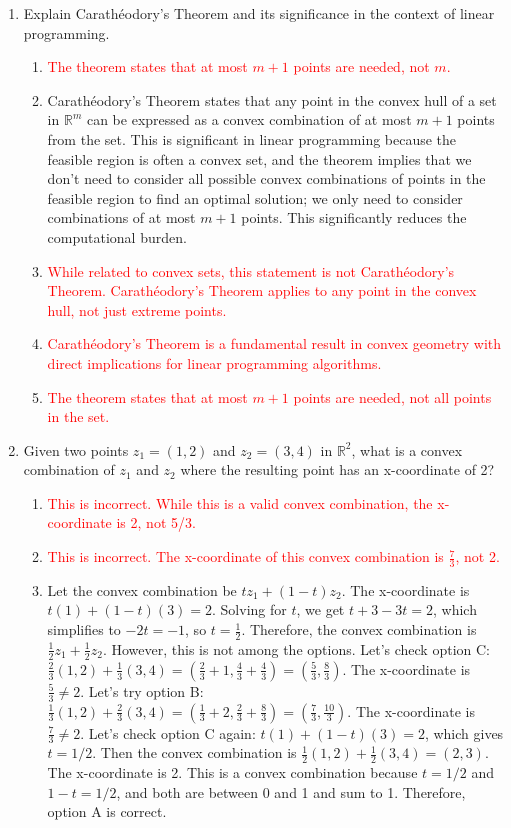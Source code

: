 \documentclass{article}%
\newcommand{\incorrect}[1]{\textcolor{red}{#1}}
\begin{document}
\begin{enumerate}
\begin{enumerate}
\end{enumerate}%
\vspace{1em}%
\item Explain Carathéodory's Theorem and its significance in the context of linear programming.%
\begin{enumerate}%
\item \incorrect{The theorem states that at most $m+1$ points are needed, not $m$.}%
\item Carathéodory's Theorem states that any point in the convex hull of a set in $\mathbb{R}^m$ can be expressed as a convex combination of at most $m+1$ points from the set.  This is significant in linear programming because the feasible region is often a convex set, and the theorem implies that we don't need to consider all possible convex combinations of points in the feasible region to find an optimal solution; we only need to consider combinations of at most $m+1$ points. This significantly reduces the computational burden.%
\item \incorrect{While related to convex sets, this statement is not Carathéodory's Theorem.  Carathéodory's Theorem applies to any point in the convex hull, not just extreme points.}%
\item \incorrect{Carathéodory's Theorem is a fundamental result in convex geometry with direct implications for linear programming algorithms.}%
\item \incorrect{The theorem states that at most $m+1$ points are needed, not all points in the set.}%
\end{enumerate}%
\vspace{1em}%
\item Given two points $z_1 = (1, 2)$ and $z_2 = (3, 4)$ in $\mathbb{R}^2$, what is a convex combination of $z_1$ and $z_2$ where the resulting point has an x-coordinate of 2?%
\begin{enumerate}%
\item \incorrect{This is incorrect. While this is a valid convex combination, the x-coordinate is 2, not 5/3.}%
\item \incorrect{This is incorrect. The x-coordinate of this convex combination is $\frac{7}{3}$, not 2.}%
\item Let the convex combination be $tz_1 + (1-t)z_2$.  The x-coordinate is $t(1) + (1-t)(3) = 2$. Solving for $t$, we get $t + 3 - 3t = 2$, which simplifies to $-2t = -1$, so $t = \frac{1}{2}$. Therefore, the convex combination is $\frac{1}{2}z_1 + \frac{1}{2}z_2$. However, this is not among the options. Let's check option C: $\frac{2}{3}(1,2) + \frac{1}{3}(3,4) = (\frac{2}{3} + 1, \frac{4}{3} + \frac{4}{3}) = (\frac{5}{3}, \frac{8}{3})$. The x-coordinate is $\frac{5}{3} \ne 2$. Let's try option B: $\frac{1}{3}(1,2) + \frac{2}{3}(3,4) = (\frac{1}{3} + 2, \frac{2}{3} + \frac{8}{3}) = (\frac{7}{3}, \frac{10}{3})$. The x-coordinate is $\frac{7}{3} \ne 2$. Let's check option C again: $t(1) + (1-t)(3) = 2$, which gives $t = 1/2$.  Then the convex combination is $\frac{1}{2}(1,2) + \frac{1}{2}(3,4) = (2,3)$. The x-coordinate is 2. This is a convex combination because $t = 1/2$ and $1-t = 1/2$, and both are between 0 and 1 and sum to 1. Therefore, option A is correct.%

\end{enumerate}
\end{enumerate}
\end{document}
